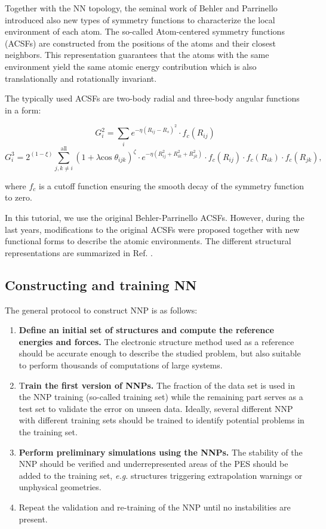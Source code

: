 \documentclass[12pt]{article}
\begin{document}
Together with the NN topology, the seminal work of Behler and Parrinello introduced also new types of symmetry functions to characterize the local environment of each atom. The so-called Atom-centered symmetry functions (ACSFs)\cite{behl11jcp} are constructed from the positions of the atoms and their closest neighbors. This representation guarantees that the atoms with the same environment yield the same atomic energy contribution which is also translationally and rotationally invariant. 

The typically used ACSFs are two-body radial and three-body angular functions in a form:

\begin{equation}
    G_i^2  = \sum_i e^{-\eta (R_{ij}-R_s)^2} \cdot f_c(R_{ij}) \label{eq:radial}
\end{equation}
\begin{equation}
    G_i^3  = 2^{(1-\xi)} \sum_{j,k \neq i}^{\mathrm{all}}(1 + \lambda \mathrm{cos}\;\theta_{ijk})^{\zeta} \cdot e^{-\eta (R_{ij}^2 + R_{ik}^2 + R_{jk}^2)} \cdot f_c(R_{ij}) \cdot f_c(R_{ik}) \cdot f_c(R_{jk}),
    \label{eq:angular}
\end{equation}

where $f_c$ is a cutoff function ensuring the smooth decay of the symmetry function to zero.   

In this tutorial, we use the original Behler-Parrinello ACSFs. However, during the last years, modifications to the original ACSFs were proposed together with new functional forms to describe the atomic environments. The different structural representations are summarized in Ref. .

\subsection{Constructing and training NN}
The general protocol to construct NNP is as follows:
\begin{enumerate}
    \item \textbf{Define an initial set of structures and compute the reference energies and forces.} The electronic structure method used as a reference should be accurate enough to describe the studied problem, but also suitable to perform thousands of computations of large systems.
    \item T\textbf{rain the first version of NNPs.} The fraction of the data set is used in the NNP training (so-called training set) while the remaining part serves as a test set to validate the error on unseen data. Ideally, several different NNP with different training sets should be trained to identify potential problems in the training set.
    \item \textbf{Perform preliminary simulations using the NNPs.} The stability of the NNP should be verified and underrepresented areas of the PES should be added to the training set, \textit{e.g.} structures triggering extrapolation warnings or unphysical geometries.
    \item Repeat the validation and re-training of the NNP until no instabilities are present.
\end{enumerate}
\end{document}
